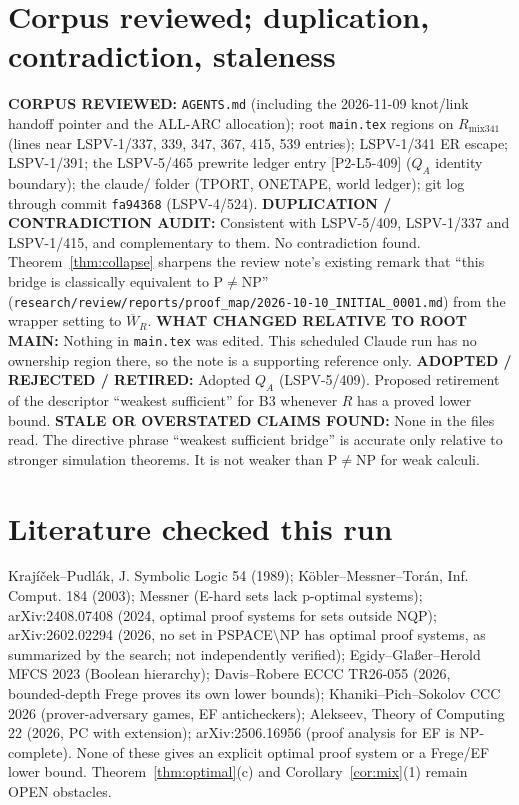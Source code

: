 \documentclass[11pt]{article}
\theoremstyle{definition}
\newcommand{\Wbar}{\overline W}
\begin{document}
\section{Corpus reviewed; duplication, contradiction, staleness}
\textbf{CORPUS REVIEWED:} \texttt{AGENTS.md} (including the 2026-11-09 knot/link handoff pointer and the ALL-ARC allocation); root \texttt{main.tex} regions on $R_{\mathrm{mix341}}$ (lines near LSPV-1/337, 339, 347, 367, 415, 539 entries); LSPV-1/341 ER escape; LSPV-1/391; the LSPV-5/465 prewrite ledger entry [P2-L5-409] ($Q_A$ identity boundary); the claude/ folder (TPORT, ONETAPE, world ledger); git log through commit \texttt{fa94368} (LSPV-4/524).
\textbf{DUPLICATION / CONTRADICTION AUDIT:} Consistent with LSPV-5/409, LSPV-1/337 and LSPV-1/415, and complementary to them. No contradiction found. Theorem~\ref{thm:collapse} sharpens the review note's existing remark that ``this bridge is classically equivalent to P$\neq$NP'' (\texttt{research/review/reports/proof\_map/2026-10-10\_INITIAL\_0001.md}) from the wrapper setting to $\Wbar_R$.
\textbf{WHAT CHANGED RELATIVE TO ROOT MAIN:} Nothing in \texttt{main.tex} was edited. This scheduled Claude run has no ownership region there, so the note is a supporting reference only.
\textbf{ADOPTED / REJECTED / RETIRED:} Adopted $Q_A$ (LSPV-5/409). Proposed retirement of the descriptor ``weakest sufficient'' for B3 whenever $R$ has a proved lower bound.
\textbf{STALE OR OVERSTATED CLAIMS FOUND:} None in the files read. The directive phrase ``weakest sufficient bridge'' is accurate only relative to stronger simulation theorems. It is not weaker than P$\neq$NP for weak calculi.

\section*{Literature checked this run}
Krajíček--Pudl\'ak, J. Symbolic Logic 54 (1989); Köbler--Messner--Torán, Inf. Comput. 184 (2003); Messner (E-hard sets lack p-optimal systems); arXiv:2408.07408 (2024, optimal proof systems for sets outside NQP); arXiv:2602.02294 (2026, no set in PSPACE$\setminus$NP has optimal proof systems, as summarized by the search; not independently verified); Egidy--Glaßer--Herold MFCS 2023 (Boolean hierarchy); Davis--Robere ECCC TR26-055 (2026, bounded-depth Frege proves its own lower bounds); Khaniki--Pich--Sokolov CCC 2026 (prover-adversary games, EF anticheckers); Alekseev, Theory of Computing 22 (2026, PC with extension); arXiv:2506.16956 (proof analysis for EF is NP-complete). None of these gives an explicit optimal proof system or a Frege/EF lower bound. Theorem~\ref{thm:optimal}(c) and Corollary~\ref{cor:mix}(1) remain OPEN obstacles.
\end{document}
